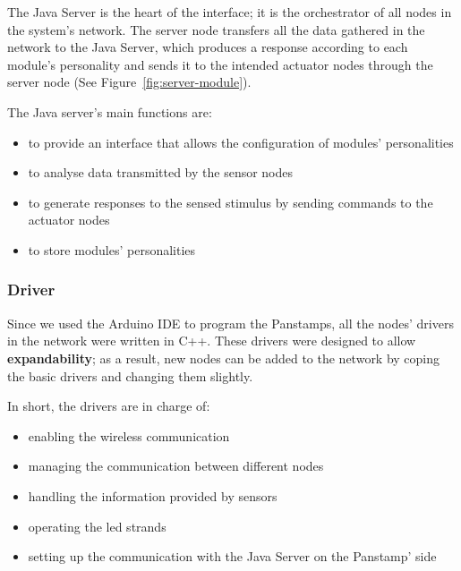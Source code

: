 The Java Server is the heart of the interface; it is the orchestrator of all nodes in the system's network. The server node transfers all the data gathered in the network to the Java Server, which produces a response according to each module's personality and sends it to the intended actuator nodes through the server node (See Figure~\ref{fig:server-module}).  

The Java server's main functions are:
\begin{itemize}
\item to provide an interface that allows the configuration of modules' personalities
\item to analyse data transmitted by the sensor nodes
\item to generate responses to the sensed stimulus by sending commands to the actuator nodes
\item to store modules' personalities
\end{itemize}


\subsubsection{Driver} 
Since we used the Arduino IDE to program the Panstamps, all the nodes' drivers in the network were written in C++. These drivers were designed to allow \textbf{expandability}; as a result, new nodes can be added to the network by coping the basic drivers and changing them slightly. 

In short, the drivers are in charge of:
\begin{itemize}
\item enabling the wireless communication
\item managing the communication between different nodes
\item handling the information provided by sensors 
\item operating the led strands
\item setting up the communication with the Java Server on the Panstamp' side
\end{itemize}